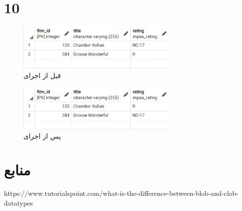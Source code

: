 \documentclass{article}
\begin{document}
\section{10}
\begin{figure}[H]
    \centering
    \includegraphics[width=0.7\textwidth]{figures/10-a.jpg}
    \caption
	{
قبل از اجرای 
	}
    \label{fig:fig1}
\end{figure}
\begin{figure}[H]
    \centering
    \includegraphics[width=0.7\textwidth]{figures/10-b.jpg}
    \caption
	{
پس از اجرای 
	}
    \label{fig:fig1}
\end{figure}




\section*{منابع}
\renewcommand{\section}[2]{}%
\begin{thebibliography}{99} %


\begin{LTRitems}

\resetlatinfont

 https://www.tutorialspoint.com/what-is-the-difference-between-blob-and-clob-datatypes
\end{LTRitems}

\end{thebibliography}
\end{document}
